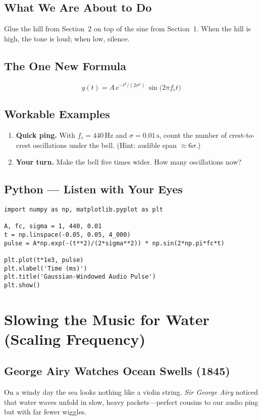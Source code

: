 \documentclass[12pt]{article}
\begin{document}
\subsection*{What We Are About to Do}
Glue the hill from Section~2 on top of the sine from Section~1. When the hill is high, the tone is loud; when low, silence.

\subsection*{The One New Formula}
\begin{equation}
  y(t)=A\,e^{-t^{2}/(2\sigma^{2})}\,\sin\bigl(2\pi f_{c}t\bigr)
\end{equation}

\subsection*{Workable Examples}
\begin{enumerate}
  \item \textbf{Quick ping.}  With \(f_{c}=440\,\text{Hz}\) and \(\sigma=0.01\,\text{s}\), count the number of crest-to-crest oscillations under the bell. (Hint: audible span \(\approx6\sigma\).)
  \item \textbf{Your turn.}  Make the bell five times wider. How many oscillations now?
\end{enumerate}

\subsection*{Python — Listen with Your Eyes}
\begin{lstlisting}[caption=Gaussian-windowed tone,label=lst:ping]
import numpy as np, matplotlib.pyplot as plt

A, fc, sigma = 1, 440, 0.01
t = np.linspace(-0.05, 0.05, 4_000)
pulse = A*np.exp(-(t**2)/(2*sigma**2)) * np.sin(2*np.pi*fc*t)

plt.plot(t*1e3, pulse)
plt.xlabel('Time (ms)')
plt.title('Gaussian-Windowed Audio Pulse')
plt.show()
\end{lstlisting}

\section{Slowing the Music for Water (Scaling Frequency)}
\subsection*{George Airy Watches Ocean Swells (1845)}
On a windy day the sea looks nothing like a violin string. \textit{Sir George Airy} noticed that water waves unfold in slow, heavy packets—perfect cousins to our audio ping but with far fewer wiggles.
\end{document}
